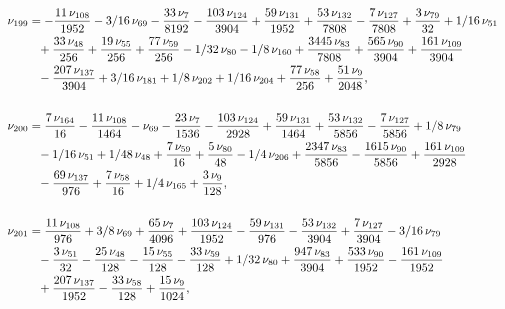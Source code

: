 \documentclass[a4paper,12pt, DIV=14, BCOR=5mm, twoside, headsepline]{scrbook}
\begin{document}
\begin{align}
\begin{aligned}
\\
\nu_{{199}}&=-{\frac {11\,\nu_{{108}}}{1952}}-3/16\,\nu_{{69}}-{\frac {
33\,\nu_{{7}}}{8192}}-{\frac {103\,\nu_{{124}}}{3904}}+{\frac {59\,\nu
_{{131}}}{1952}}+{\frac {53\,\nu_{{132}}}{7808}}-{\frac {7\,\nu_{{127}
}}{7808}}+{\frac {3\,\nu_{{79}}}{32}}+1/16\,\nu_{{51}}\\
 &\hphantom{=}+{\frac {33\,\nu
_{{48}}}{256}}+{\frac {19\,\nu_{{55}}}{256}}+{\frac {77\,\nu_{{59}}}{
256}}-1/32\,\nu_{{80}}-1/8\,\nu_{{160}}+{\frac {3445\,\nu_{{83}}}{7808
}}+{\frac {565\,\nu_{{90}}}{3904}}+{\frac {161\,\nu_{{109}}}{3904}}\\
 &\hphantom{=}-{
\frac {207\,\nu_{{137}}}{3904}}+3/16\,\nu_{{181}}+1/8\,\nu_{{202}}+1/
16\,\nu_{{204}}+{\frac {77\,\nu_{{58}}}{256}}+{\frac {51\,\nu_{{9}}}{
2048}}, \\
\\
\nu_{{200}}&={\frac {7\,\nu_{{164}}}{16}}-{\frac {11\,\nu_{{108}
}}{1464}}-\nu_{{69}}-{\frac {23\,\nu_{{7}}}{1536}}-{\frac {103\,\nu_{{
124}}}{2928}}+{\frac {59\,\nu_{{131}}}{1464}}+{\frac {53\,\nu_{{132}}
}{5856}}-{\frac {7\,\nu_{{127}}}{5856}}+1/8\,\nu_{{79}}\\
 &\hphantom{=}-1/16\,\nu_{{51
}}+1/48\,\nu_{{48}}+{\frac {7\,\nu_{{59}}}{16}}+{\frac {5\,\nu_{{80}}
}{48}}-1/4\,\nu_{{206}}+{\frac {2347\,\nu_{{83}}}{5856}}-{\frac {1615
\,\nu_{{90}}}{5856}}+{\frac {161\,\nu_{{109}}}{2928}}\\
 &\hphantom{=}-{\frac {69\,\nu_
{{137}}}{976}}+{\frac {7\,\nu_{{58}}}{16}}+1/4\,\nu_{{165}}+{\frac {3
\,\nu_{{9}}}{128}}, \\
\\
\nu_{{201}}&={\frac {11\,\nu_{{108}}}{976}}+3/8\,\nu
_{{69}}+{\frac {65\,\nu_{{7}}}{4096}}+{\frac {103\,\nu_{{124}}}{1952}}
-{\frac {59\,\nu_{{131}}}{976}}-{\frac {53\,\nu_{{132}}}{3904}}+{
\frac {7\,\nu_{{127}}}{3904}}-3/16\,\nu_{{79}}\\
 &\hphantom{=}-{\frac {3\,\nu_{{51}}}{
32}}-{\frac {25\,\nu_{{48}}}{128}}-{\frac {15\,\nu_{{55}}}{128}}-{
\frac {33\,\nu_{{59}}}{128}}+1/32\,\nu_{{80}}+{\frac {947\,\nu_{{83}}
}{3904}}+{\frac {533\,\nu_{{90}}}{1952}}-{\frac {161\,\nu_{{109}}}{
1952}}\\
 &\hphantom{=}+{\frac {207\,\nu_{{137}}}{1952}}-{\frac {33\,\nu_{{58}}}{128}}+
{\frac {15\,\nu_{{9}}}{1024}},
\end{aligned}
\end{align}
\end{document}
